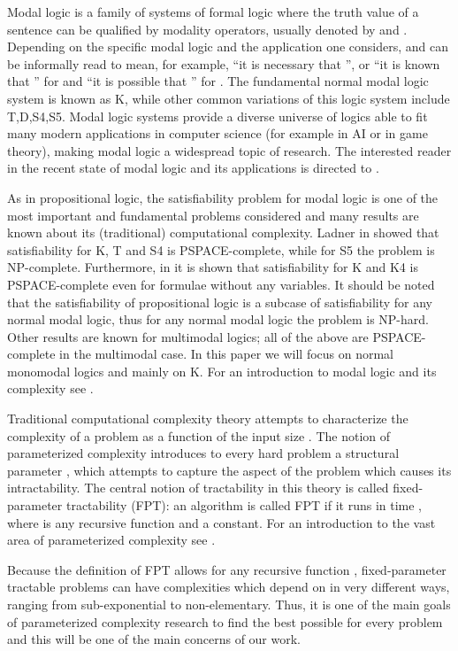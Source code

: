 \documentclass{llncs}
\begin{document}
Modal logic is a family of systems of formal logic where the truth value of a sentence  can be qualified by
modality operators, usually denoted by  and . Depending on the specific modal logic and the
application one considers,  and  can be informally read to mean, for example, ``it is
necessary that '', or ``it is known that '' for  and ``it is possible that '' for
. The fundamental normal modal logic system is known as K, while other common variations of this logic
system include T,D,S4,S5. Modal logic systems provide a diverse universe of logics able to fit many modern
applications in computer science (for example in AI or in game theory), making modal logic a widespread topic of
research. The interested reader in the recent state of modal logic and its applications is directed to
\cite{handbook-modal}.

As in propositional logic, the satisfiability problem for modal logic is one of the most important and fundamental
problems considered and many results are known about its (traditional) computational complexity. Ladner in
\cite{lad} showed that satisfiability for K, T and S4 is PSPACE-complete, while for S5 the problem is NP-complete.
Furthermore,
in \cite{DBLP:conf/aiml/ChagrovR02}
it is shown that satisfiability for K and K4 is PSPACE-complete even
for formulae without any variables.
It should be noted that the satisfiability of propositional logic is a subcase of satisfiability for any normal
modal logic, thus for any normal modal logic the problem is NP-hard.  Other results are known for multimodal
logics; all of the above are PSPACE-complete in the multimodal case.  In this paper we will focus on normal
monomodal logics and mainly on K. For an introduction to modal logic and its complexity see
\cite{130913,Fagin1995ReasoningAboutKnowledge}.

Traditional computational complexity theory attempts to characterize the complexity of a problem as a function of
the input size . The notion of parameterized complexity introduces to every hard problem a structural parameter
, which attempts to capture the aspect of the problem which causes its intractability. The central notion of
tractability in this theory is called fixed-parameter tractability (FPT): an algorithm is called FPT if it runs in
time , where  is any recursive function and  a constant. For an introduction to the vast
area of parameterized complexity see \cite{downey1999pc,flum2006pct}.

Because the definition of FPT allows for any recursive function , fixed-parameter tractable problems can
have complexities which depend on  in very different ways, ranging from sub-exponential to non-elementary.
Thus, it is one of the main goals of parameterized complexity research to find the best possible  for every
problem and this will be one of the main concerns of our work.
\end{document}
